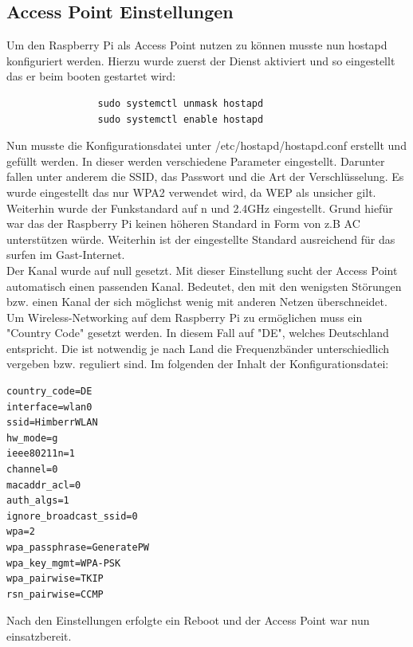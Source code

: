 \documentclass[a4paper,11pt,singlespacing]{article}
\begin{document}
            \subsection{Access Point Einstellungen}
                Um den Raspberry Pi als Access Point nutzen zu können musste nun hostapd konfiguriert werden. Hierzu wurde zuerst der Dienst aktiviert und so eingestellt das er beim booten gestartet wird:
                  \begin{lstlisting}
                sudo systemctl unmask hostapd
                sudo systemctl enable hostapd
                  \end{lstlisting} 
                
                    Nun musste die Konfigurationsdatei unter /etc/hostapd/hostapd.conf erstellt und gefüllt werden.
                    In dieser werden verschiedene Parameter eingestellt. Darunter fallen unter anderem die SSID, das Passwort und die Art der Verschlüsselung. Es wurde eingestellt das nur WPA2 verwendet wird, da WEP als unsicher gilt. Weiterhin wurde der Funkstandard auf n und 2.4GHz eingestellt. Grund hiefür war das der Raspberry Pi keinen höheren Standard in Form von z.B AC unterstützen würde. Weiterhin ist der eingestellte Standard ausreichend  für das surfen im Gast-Internet. \\
                    Der Kanal wurde auf null gesetzt. Mit dieser Einstellung sucht der Access Point automatisch einen passenden Kanal. Bedeutet, den mit den wenigsten Störungen bzw. einen Kanal der sich möglichst wenig mit anderen Netzen überschneidet.\\
                    Um Wireless-Networking auf dem Raspberry Pi zu ermöglichen muss ein "Country Code" gesetzt werden. In diesem Fall auf "DE", welches Deutschland entspricht. Die ist notwendig je nach Land die Frequenzbänder unterschiedlich vergeben bzw. reguliert sind. Im folgenden der Inhalt der Konfigurationsdatei:
 
                
                    \begin{lstlisting}
country_code=DE
interface=wlan0
ssid=HimberrWLAN
hw_mode=g
ieee80211n=1
channel=0
macaddr_acl=0
auth_algs=1
ignore_broadcast_ssid=0
wpa=2
wpa_passphrase=GeneratePW
wpa_key_mgmt=WPA-PSK
wpa_pairwise=TKIP
rsn_pairwise=CCMP
                    \end{lstlisting} 
                   
                   Nach den Einstellungen erfolgte ein Reboot und der Access Point war nun einsatzbereit.
                
\end{document}
